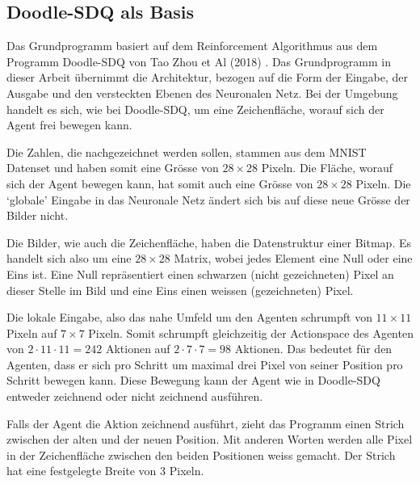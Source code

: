 \subsection*{Doodle-SDQ als Basis}
Das Grundprogramm basiert auf dem Reinforcement Algorithmus aus dem Programm
Doodle-SDQ von Tao Zhou et Al (2018) \cite{zhou_learning_2018}. Das
Grundprogramm in dieser Arbeit übernimmt die Architektur, bezogen auf die Form
der Eingabe, der Ausgabe und den versteckten Ebenen des Neuronalen Netz.
Bei der Umgebung handelt es sich, wie bei Doodle-SDQ, um eine Zeichenfläche,
worauf sich der Agent frei bewegen kann.

Die Zahlen, die nachgezeichnet werden sollen, stammen aus dem MNIST Datenset und
haben somit eine Grösse von $28\times28$ Pixeln. Die Fläche, worauf sich der Agent
bewegen kann, hat somit auch eine Grösse von $28\times28$ Pixeln. Die `globale' Eingabe
in das Neuronale Netz ändert sich bis auf diese neue Grösse der Bilder nicht.

Die Bilder, wie auch die Zeichenfläche, haben die Datenstruktur einer Bitmap. Es
handelt sich also um eine $28\times28$ Matrix, wobei jedes Element eine Null oder eine %
Eins ist. Eine Null repräsentiert einen schwarzen (nicht gezeichneten) Pixel an
dieser Stelle im Bild und eine Eins einen weissen (gezeichneten) Pixel.


Die lokale Eingabe, also das nahe Umfeld um den Agenten schrumpft von
$11\times11$ Pixeln auf $7\times7$ Pixeln. Somit schrumpft gleichzeitig der
Actionspace des Agenten von $2\cdot11\cdot11 = 242$ Aktionen auf $2\cdot7\cdot7
= 98$ Aktionen. Das bedeutet für den Agenten, dass er sich pro Schritt um
maximal drei Pixel von seiner Position pro Schritt bewegen kann. Diese Bewegung
kann der Agent wie in Doodle-SDQ entweder zeichnend oder nicht zeichnend
ausführen.

Falls der Agent die Aktion zeichnend ausführt, zieht das Programm einen Strich
zwischen der alten und der neuen Position. Mit anderen Worten werden alle Pixel
in der Zeichenfläche zwischen den beiden Positionen weiss gemacht. Der Strich
hat eine festgelegte Breite von $3$ Pixeln.

